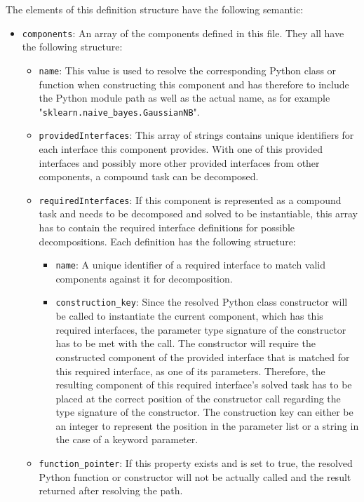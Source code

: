 The elements of this definition structure have the following semantic:
\begin{itemize}
	\item \texttt{components}: An array of the components defined in this file. They all have the following structure:
		\begin{itemize}[label=\textbullet]
			\item \texttt{name}: This value is used to resolve the corresponding Python class or function when constructing this component and has therefore to include the Python module path as well as the actual name, as for example "\texttt{sklearn.naive\_bayes.GaussianNB}".
			\item \texttt{providedInterfaces}: This array of strings contains unique identifiers for each interface this component provides. With one of this provided interfaces and possibly more other provided interfaces from other components, a compound task can be decomposed. 
            \item \texttt{requiredInterfaces}: If this component is represented as a compound task and needs to be decomposed and solved to be instantiable, this array has to contain the required interface definitions for possible decompositions. Each definition has the following structure:
            \begin{itemize}[label=\textbullet]
                \item \texttt{name}: A unique identifier of a required interface to match valid components against it for decomposition.
                \item \texttt{construction\_key}: Since the resolved Python class constructor will be called to instantiate the current component, which has this required interfaces, the parameter type signature of the constructor has to be met with the call.
                    The constructor will require the constructed component of the provided interface that is matched for this required interface, as one of its parameters.
                    Therefore, the resulting component of this required interface's solved task has to be placed at the correct position of the constructor call regarding the type signature of the constructor.
                    The construction key can either be an integer to represent the position in the parameter list or a string in the case of a keyword parameter. 
            \end{itemize}
            \item \texttt{function\_pointer}: If this property exists and is set to true, the resolved Python function or constructor will not be actually called and the result returned after resolving the path.

\end{itemize}
\end{itemize}
